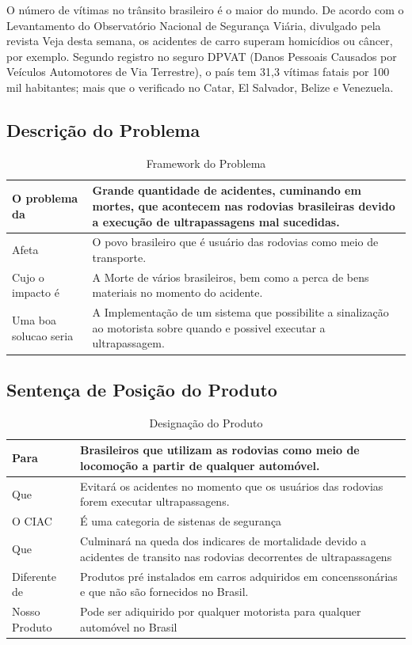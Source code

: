 O número de vítimas no trânsito brasileiro é o maior do mundo. De acordo com o Levantamento do Observatório
 Nacional de Segurança Viária, divulgado pela revista Veja desta semana, os acidentes de carro superam
 homicídios ou câncer, por exemplo. Segundo registro no seguro DPVAT (Danos Pessoais Causados por Veículos
  Automotores de Via Terrestre), o país tem 31,3 vítimas fatais por 100 mil habitantes; mais que o
  verificado no Catar, El Salvador, Belize e Venezuela.\cite{brasilTemMaisVitimasDeTransito}


\subsection{Descrição do Problema}
\begin{table}[ht]
\caption{Framework do Problema}
\centering
\begin{tabular}{| l |  p{7cm} |}
\hline
O problema da & Grande quantidade de acidentes, cuminando em mortes, que acontecem nas rodovias brasileiras devido a execução de ultrapassagens mal sucedidas.  \\
\hline
Afeta & O povo brasileiro que é usuário das rodovias como meio de transporte. \\
\hline
Cujo o impacto é & A Morte de vários brasileiros, bem como a perca de bens materiais no momento do acidente.\\
\hline
Uma boa solucao seria & A Implementação de um sistema que possibilite a sinalização ao motorista sobre quando e possivel executar a ultrapassagem. \\
\hline
\end{tabular}
\end{table}


\subsection{Sentença de Posição do Produto}

\begin{table}[ht]
\caption{Designação do Produto}
\centering
\begin{tabular}{| l |  p{7cm} |}
\hline
Para & Brasileiros que utilizam as rodovias como meio de locomoção a partir de qualquer automóvel. \\
\hline
Que & Evitará os acidentes no momento que os usuários das rodovias forem executar ultrapassagens. \\
\hline
O CIAC & É uma categoria de sistenas de segurança\\
\hline
Que & Culminará na queda dos indicares de mortalidade devido a acidentes de transito nas rodovias decorrentes de ultrapassagens \\
\hline
Diferente de & Produtos pré instalados em carros adquiridos em concenssonárias e que não são fornecidos no Brasil.  \\
\hline
Nosso Produto & Pode ser adiquirido por qualquer motorista para qualquer automóvel no Brasil\\
\hline
\end{tabular}
\end{table}


